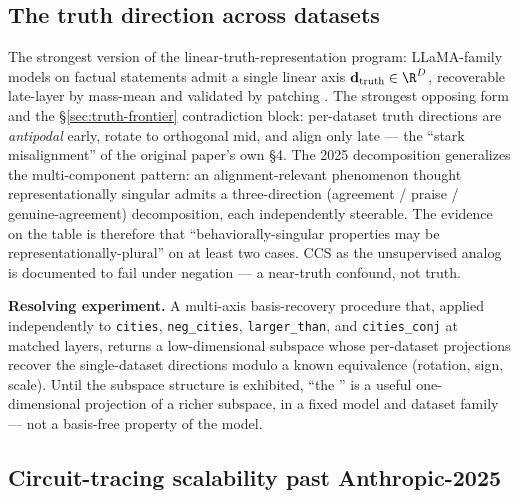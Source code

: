 \subsection{The truth direction across datasets}
\label{sec:contradictions-truth}

The strongest version of the linear-truth-representation program:
LLaMA-family models on factual statements admit a single linear axis
$\mathbf{d}_{\text{truth}} \in \R^D$, recoverable late-layer by
mass-mean and validated by patching
\citep[\S 3]{marks-tegmark-2023-truth}. The strongest opposing form
\citep[\S 4]{marks-tegmark-2023-truth} and the
\S\ref{sec:truth-frontier} contradiction block: per-dataset truth
directions are \emph{antipodal} early, rotate to orthogonal mid, and
align only late --- the ``stark misalignment'' of the original paper's
own §4. The 2025
\citet{vennemeyer2025-sycophancy-not-one-thing} 
decomposition generalizes the multi-component pattern: an
alignment-relevant phenomenon thought representationally singular
admits a three-direction (agreement / praise / genuine-agreement) %
decomposition, each independently steerable. The evidence on the table
is therefore that ``behaviorally-singular properties may be
representationally-plural'' on at least two cases. CCS as the
unsupervised analog is documented to fail under negation
\citep[\S 1.1]{marks-tegmark-2023-truth} --- a near-truth confound, not
truth.

\textbf{Resolving experiment.} A multi-axis basis-recovery procedure
that, applied independently to \texttt{cities}, \texttt{neg\_cities},
\texttt{larger\_than}, and \texttt{cities\_conj} at matched layers,
returns a low-dimensional subspace whose per-dataset projections
recover the single-dataset directions modulo a known equivalence
(rotation, sign, scale). Until the subspace structure is exhibited,
``the '' is a useful one-dimensional projection of a
richer subspace, in a fixed model and dataset family --- not a
basis-free property of the model.

\subsection{Circuit-tracing scalability past Anthropic-2025}
\label{sec:contradictions-circuit-tracing}


